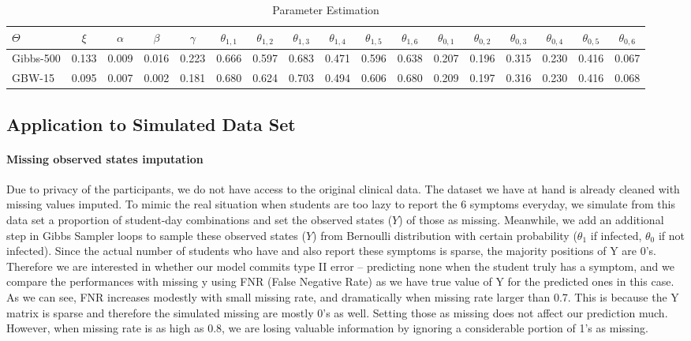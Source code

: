\documentclass{article} %
\begin{document}
\begin{table}[htpb]
\caption{Parameter Estimation}
\hspace*{-3.8cm}
\begin{tabular}{|l|c|c|c|c|c|c|c|c|c|c|c|c|c|c|c|c|}
\hline
\bfseries $\Theta$ & \bfseries $\xi$ &  \bfseries $\alpha$ & \bfseries $\beta$ & \bfseries $\gamma$ & \bfseries $\theta_{1,1}$ & \bfseries $\theta_{1,2}$ & \bfseries $\theta_{1,3}$ &\bfseries $\theta_{1,4}$ &\bfseries $\theta_{1,5}$ &\bfseries $\theta_{1,6}$ &\bfseries $\theta_{0,1}$ &\bfseries $\theta_{0,2}$ &\bfseries $\theta_{0,3}$ &\bfseries $\theta_{0,4}$ &\bfseries $\theta_{0,5}$ &\bfseries $\theta_{0,6}$ \\  
    \hline
    Gibbs-500 & 0.133 & 0.009 & 0.016 &  0.223 & 0.666 & 0.597 & 0.683 & 0.471 & 0.596 & 0.638 & 0.207 & 0.196 & 0.315 & 0.230 & 0.416 & 0.067 \\\hline
    GBW-15 & 0.095 & 0.007 & 0.002 & 0.181 & 0.680 & 0.624 & 0.703 & 0.494 & 0.606 & 0.680 & 0.209 & 0.197 & 0.316 & 0.230 & 0.416 & 0.068 \\\hline
\end{tabular}
\label{tab:para}
\end{table}

\subsection{Application to Simulated Data Set}
\paragraph {Missing observed states imputation} Due to privacy of the participants, we do not have access to the original clinical data. The dataset we have at hand is already cleaned with missing values imputed. To mimic the real situation when students are too lazy to report the 6 symptoms everyday, we simulate from this data set a proportion of student-day combinations and set the observed states ($Y$) of those as missing. Meanwhile, we add an additional step in Gibbs Sampler loops to sample these observed states ($Y$) from Bernoulli distribution with certain probability ($\theta_1$ if infected, $\theta_0$ if not infected).
Since the actual number of students who have and also report these symptoms is sparse, the majority positions of Y are 0's. Therefore we are interested in whether our model commits type II error --  predicting none when the student truly has a symptom, and we compare the performances with missing y using FNR (False Negative Rate) as we have true value of Y for the predicted ones in this case. As we can see, FNR increases modestly with small missing rate, and dramatically when missing rate larger than 0.7. This is because the Y matrix is sparse and therefore the simulated missing are mostly 0’s as well. Setting those as missing does not affect our prediction much. However, when missing rate is as high as 0.8, we are losing valuable information by ignoring a considerable portion of 1’s as missing. 
\end{document}
